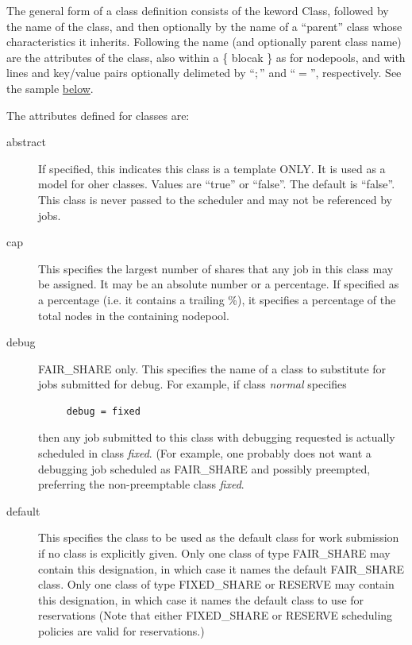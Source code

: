     The general form of a class definition consists of the keword Class, followed
    by the name of the class, and then optionally by the name of a ``parent'' class
    whose characteristics it inherits.   Following the name (and optionally parent class
    name) are the attributes of the class, also within a \{ blocak \} as for nodepools, and
    with lines and key/value pairs optionally delimeted by  ``$;$'' and ``$=$'', respectively.
    See the sample \hyperref[fig:class.configuration]{below}.

    The attributes defined for classes are:
    \begin{description}

      \item[abstract] If specified, this indicates this class is a template ONLY. It is used
        as a model for oher classes.  Values are ``true'' or ``false''.  The default is
        ``false''.  This class is never passed to the scheduler and may not be referenced
        by jobs.

      \item[cap] This specifies the largest number of shares that any job in this class
        may be assigned.  It may be an absolute number or a percentage.  If specified as
        a percentage (i.e. it contains a trailing \%), it specifies a percentage of the
        total nodes in the containing nodepool.

      \item[debug] FAIR\_SHARE only. This specifies the name of a class to substitute
        for jobs submitted for debug.  For example, if class {\em normal} specifies
\begin{verbatim}
     debug = fixed
\end{verbatim}
        then any job submitted to this class with debugging requested is actually scheduled
        in class {\em fixed}. (For example, one probably does not want a debugging job
        scheduled as FAIR\_SHARE and possibly preempted, preferring the non-preemptable
        class {\em fixed}.

      \item[default] This specifies the class to be used as the default class for work submission
        if no class is explicitly given.  Only one class of type FAIR\_SHARE may contain this
        designation, in which case it names the default FAIR\_SHARE class.  Only one class of type
        FIXED\_SHARE or RESERVE may contain this designation, in which case it names the default
        class to use for reservations (Note that either FIXED\_SHARE or RESERVE scheduling policies
        are valid for reservations.)


\end{description}
